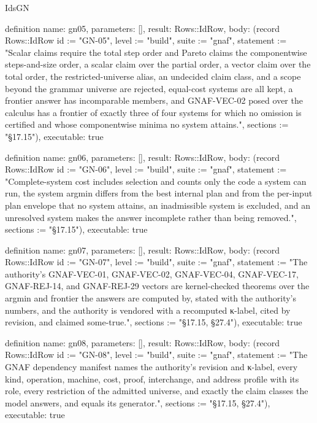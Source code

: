 \begin{lexlean}{IdsGN}
\begin{semanticmodule}
definition{
  name: gn05,
  parameters: [],
  result: Rows::IdRow,
  body: (record Rows::IdRow {id := "GN-05", level := "build", suite := "gnaf", statement := "Scalar claims require the total step order and Pareto claims the componentwise steps-and-size order, a scalar claim over the partial order, a vector claim over the total order, the restricted-universe alias, an undecided claim class, and a scope beyond the grammar universe are rejected, equal-cost systems are all kept, a frontier answer has incomparable members, and GNAF-VEC-02 posed over the calculus has a frontier of exactly three of four systems for which no omission is certified and whose componentwise minima no system attains.", sections := "§17.15"}),
  executable: true
}

definition{
  name: gn06,
  parameters: [],
  result: Rows::IdRow,
  body: (record Rows::IdRow {id := "GN-06", level := "build", suite := "gnaf", statement := "Complete-system cost includes selection and counts only the code a system can run, the system argmin differs from the best internal plan and from the per-input plan envelope that no system attains, an inadmissible system is excluded, and an unresolved system makes the answer incomplete rather than being removed.", sections := "§17.15"}),
  executable: true
}

definition{
  name: gn07,
  parameters: [],
  result: Rows::IdRow,
  body: (record Rows::IdRow {id := "GN-07", level := "build", suite := "gnaf", statement := "The authority's GNAF-VEC-01, GNAF-VEC-02, GNAF-VEC-04, GNAF-VEC-17, GNAF-REJ-14, and GNAF-REJ-29 vectors are kernel-checked theorems over the argmin and frontier the answers are computed by, stated with the authority's numbers, and the authority is vendored with a recomputed κ-label, cited by revision, and claimed some-true.", sections := "§17.15, §27.4"}),
  executable: true
}

definition{
  name: gn08,
  parameters: [],
  result: Rows::IdRow,
  body: (record Rows::IdRow {id := "GN-08", level := "build", suite := "gnaf", statement := "The GNAF dependency manifest names the authority's revision and κ-label, every kind, operation, machine, cost, proof, interchange, and address profile with its role, every restriction of the admitted universe, and exactly the claim classes the model answers, and equals its generator.", sections := "§17.15, §27.4"}),
  executable: true
}


\end{semanticmodule}
\end{lexlean}
